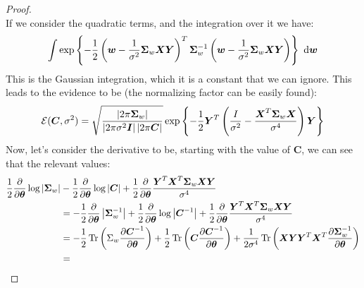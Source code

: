 \begin{proof}
\begin{equation*}
    \end{equation*}
    If we consider the quadratic terms, and the integration over it we have:
    \begin{equation*}
        \int \exp\left\{ -\frac{1}{2}\left( \boldsymbol w-\frac{1}{\sigma^2}\boldsymbol \Sigma_w\boldsymbol X\boldsymbol Y \right)^T\boldsymbol \Sigma^{-1}_w\left( \boldsymbol w - \frac{1}{\sigma^2}\boldsymbol \Sigma_w\boldsymbol X\boldsymbol Y \right) \right\} \ \mathrm{d} \boldsymbol w
    \end{equation*}
    This is the Gaussian integration, which it is a constant that we can ignore. This leads to the evidence to be (the normalizing factor can be easily found):
    \begin{equation*}
        \mathcal{E}(\boldsymbol C, \sigma^2) = \sqrt{\frac{\left| 2\pi\boldsymbol \Sigma_w \right|}{\left| 2\pi\sigma^2\boldsymbol I \right|\left| 2\pi\boldsymbol C \right|}}\exp\left\{ -\frac{1}{2}\boldsymbol Y^T\left( \frac{I}{\sigma^2} - \frac{\boldsymbol X^T\boldsymbol \Sigma_w\boldsymbol X}{\sigma^4} \right)\boldsymbol Y \right\}
    \end{equation*}
    Now, let's consider the derivative to be, starting with the value of $\boldsymbol C$, we can see that the relevant values:
    \begin{equation*}
    \begin{aligned}
        \frac{1}{2}\frac{\partial}{\partial \boldsymbol \theta}\log\abs{\boldsymbol \Sigma_w} &- \frac{1}{2}\frac{\partial}{\partial \boldsymbol \theta}\log\abs{\boldsymbol C} + \frac{1}{2}\frac{\partial}{\partial \boldsymbol  \theta}\frac{\boldsymbol Y^T\boldsymbol X^T\boldsymbol \Sigma_w\boldsymbol X\boldsymbol Y}{\sigma^4} \\
        &= -\frac{1}{2}\frac{\partial}{\partial \boldsymbol \theta}\abs{\boldsymbol \Sigma_w^{-1}} + \frac{1}{2}\frac{\partial}{\partial \boldsymbol  \theta}\log\abs{\boldsymbol C^{-1}} + \frac{1}{2}\frac{\partial}{\partial \boldsymbol  \theta}\frac{\boldsymbol Y^T\boldsymbol X^T\boldsymbol \Sigma_w\boldsymbol X\boldsymbol Y}{\sigma^4} \\ 
        &= -\frac{1}{2}\operatorname{Tr}\bracka{\Sigma_w\frac{\partial \boldsymbol C^{-1}}{\partial \boldsymbol \theta}} + \frac{1}{2}\operatorname{Tr}\bracka{\boldsymbol C\frac{\partial \boldsymbol C^{-1}}{\partial \boldsymbol \theta}} + \frac{1}{2\sigma^4}\operatorname{Tr}\bracka{\boldsymbol X\boldsymbol Y\boldsymbol Y^T\boldsymbol X^T\frac{\partial \boldsymbol \Sigma^{-1}_w}{\partial \boldsymbol \theta}} \\
        &=\begin{aligned}[t]

\end{aligned}
\end{aligned}
\end{equation*}
\end{proof}
